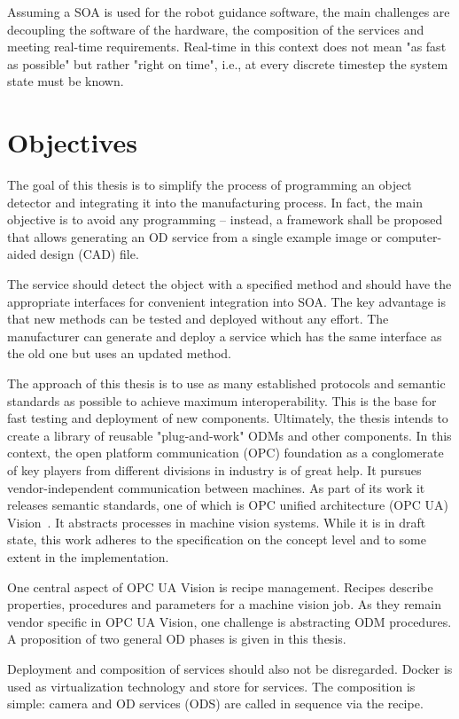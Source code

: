 Assuming a SOA is used for the robot guidance software, the main challenges are decoupling the software of the hardware, the composition of the services and meeting real-time requirements. Real-time in this context does not mean "as fast as possible" but rather "right on time", i.e., at every discrete timestep the system state must be known.

\section{Objectives}
The goal of this thesis is to simplify the process of programming an object detector and integrating it into the manufacturing process. In fact, the main objective is to avoid any programming – instead, a framework shall be proposed that allows generating an OD service from a single example image or computer-aided design (CAD) file.

The service should detect the object with a specified method and should have the appropriate interfaces for convenient integration into SOA. The key advantage is that new methods can be tested and deployed without any effort. The manufacturer can generate and deploy a service which has the same interface as the old one but uses an updated method.

The approach of this thesis is to use as many established protocols and semantic standards as possible to achieve maximum interoperability. This is the base for fast testing and deployment of new components. Ultimately, the thesis intends to create a library of reusable "plug-and-work" ODMs and other components. In this context, the open platform communication (OPC) foundation as a conglomerate of key players from different divisions in industry is of great help. It pursues vendor-independent communication between machines. As part of its work it releases semantic standards, one of which is OPC unified architecture (OPC UA) Vision~\cite{VDMA2018OPC40100-1:2018-11}. It abstracts processes in machine vision systems. While it is in draft state, this work adheres to the specification on the concept level and to some extent in the implementation. 

One central aspect of OPC UA Vision is recipe management. Recipes describe properties, procedures and parameters for a machine vision job. As they remain vendor specific in OPC UA Vision, one challenge is abstracting ODM procedures. A proposition of two general OD phases is given in this thesis.

Deployment and composition of services should also not be disregarded. Docker is used as virtualization technology and store for services. The composition is simple: camera and OD services (ODS) are called in sequence via the recipe.

